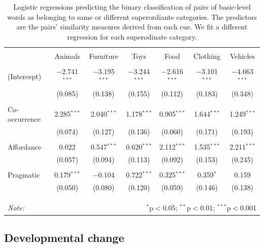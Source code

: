 \documentclass[english,,man,floatsintext]{apa6}
\begin{document}
\begin{table}[!htbp] \centering 
\caption{\label{tab:regressions} Logistic regressions predicting the binary classification of pairs of basic-level words as belonging to same or different superordiante categories. The predictors are the pairs' similarity measures derived from each cue. We fit a different regression for each superodinate category.} 
\label{} 
\begin{tabular}{@{\extracolsep{5pt}}lcccccc} 
\hline 
 & \multicolumn{6}{c}{} \\
 & Animals & Furniture & Toys & Food & Clothing & Vehicles \\ 
\hline \\[-1.8ex] 
 (Intercept) & $-$2.741$^{***}$ & $-$3.195$^{***}$ & $-$3.244$^{***}$ & $-$2.616$^{***}$ & $-$3.101$^{***}$ & $-$4.663$^{***}$ \\ 
  & (0.085) & (0.138) & (0.155) & (0.112) & (0.183) & (0.348) \\ 
  & & & & & & \\ 
 Co-occurrence & 2.285$^{***}$ & 2.040$^{***}$ & 1.178$^{***}$ & 0.905$^{***}$ & 1.644$^{***}$ & 1.249$^{***}$ \\ 
  & (0.074) & (0.127) & (0.136) & (0.060) & (0.171) & (0.193) \\ 
  & & & & & & \\ 
 Affordance & 0.022 & 0.547$^{***}$ & 0.620$^{***}$ & 2.112$^{***}$ & 1.535$^{***}$ & 2.211$^{***}$ \\ 
  & (0.057) & (0.094) & (0.113) & (0.092) & (0.153) & (0.245) \\ 
  & & & & & & \\ 
 Pragmatic & 0.179$^{***}$ & $-$0.104 & 0.722$^{***}$ & 0.325$^{***}$ & 0.359$^{*}$ & 0.159 \\ 
  & (0.050) & (0.080) & (0.120) & (0.059) & (0.146) & (0.138) \\ 
  & & & & & & \\ 
 \\[-1.8ex] 

\hline \\[-1.8ex] 
\textit{Note:}  & \multicolumn{6}{r}{$^{*}$p$<$0.05; $^{**}$p$<$0.01; $^{***}$p$<$0.001} \\ 
\end{tabular} 
\end{table}

\hypertarget{developmental-change}{%
\subsection{Developmental change}\label{developmental-change}}
\end{document}
